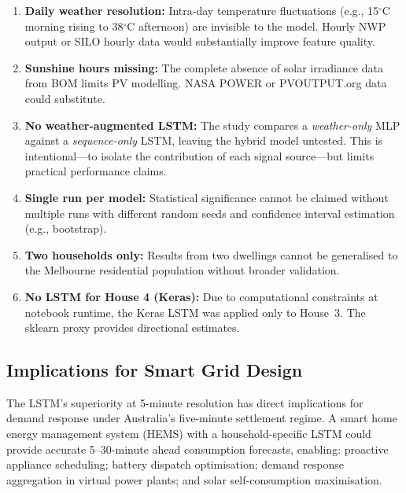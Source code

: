 \documentclass[12pt,a4paper]{article}
\begin{document}
\begin{enumerate}[label=L\arabic*.,leftmargin=3em]
  \item \textbf{Daily weather resolution:} Intra-day temperature fluctuations
        (e.g., 15$^\circ$C morning rising to 38$^\circ$C afternoon) are
        invisible to the model. Hourly NWP output or SILO hourly data would
        substantially improve feature quality.

  \item \textbf{Sunshine hours missing:} The complete absence of solar
        irradiance data from BOM limits PV modelling. NASA POWER or
        PVOUTPUT.org data could substitute.

  \item \textbf{No weather-augmented LSTM:} The study compares a
        \emph{weather-only} MLP against a \emph{sequence-only} LSTM, leaving
        the hybrid model untested. This is intentional---to isolate the
        contribution of each signal source---but limits practical performance
        claims.

  \item \textbf{Single run per model:} Statistical significance cannot be
        claimed without multiple runs with different random seeds and
        confidence interval estimation (e.g., bootstrap).

  \item \textbf{Two households only:} Results from two dwellings cannot be
        generalised to the Melbourne residential population without broader
        validation.

  \item \textbf{No LSTM for House 4 (Keras):} Due to computational
        constraints at notebook runtime, the Keras LSTM was applied only to
        House~3. The sklearn proxy provides directional estimates.
\end{enumerate}

\subsection{Implications for Smart Grid Design}

The LSTM's superiority at 5-minute resolution has direct implications for
demand response under Australia's five-minute settlement regime. A smart home
energy management system (HEMS) with a household-specific LSTM could provide
accurate 5--30-minute ahead consumption forecasts, enabling: proactive
appliance scheduling; battery dispatch optimisation; demand response
aggregation in virtual power plants; and solar self-consumption maximisation.
\end{document}

